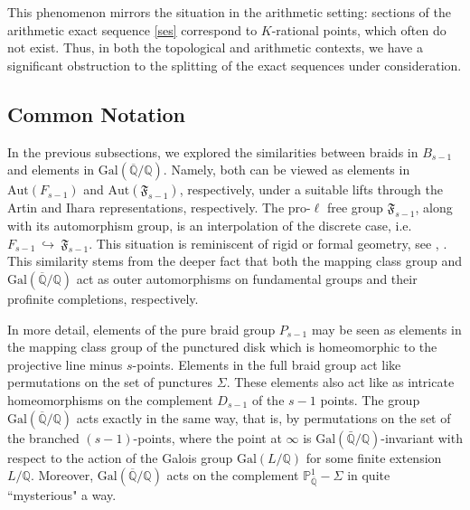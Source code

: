 \documentclass[10pt]{amsart}
\theoremstyle{definition}
\newcommand{\Q}{\mathbb{Q}}
\newcommand{\Gal}{{ \mathrm{Gal}}}
\begin{document}
This phenomenon mirrors the situation in the arithmetic setting: sections of the arithmetic exact sequence \eqref{ses} correspond to $K$-rational points, which often do not exist. Thus, in both the topological and arithmetic contexts, we have a significant obstruction to the splitting of the exact sequences under consideration.




\subsection{Common Notation} In the previous subsections, we explored the similarities between braids in $B_{s-1}$ and elements in $\Gal(\overline{\mathbb{Q}}/\mathbb{Q})$. 
Namely, both can be viewed as elements in $\mathrm{Aut}(F_{s-1})$ and $\mathrm{Aut}(\mathfrak{F}_{s-1})$, respectively, under a suitable lifts through the Artin and Ihara representations, respectively. The pro-$\ell$ free group $\mathfrak{F}_{s-1}$, along with its automorphism group, is an interpolation of the discrete case, i.e. $F_{s-1}~\hookrightarrow~\mathfrak{F}_{s-1}$. 
This situation is reminiscent of rigid or formal geometry, see \cite{KatoRigid}, \cite[Ch. 9]{Hartshorne:77}. 
This similarity stems from the deeper fact that both the mapping class group and $\Gal(\overline{\mathbb{Q}}/\mathbb{Q})$ act as outer automorphisms on fundamental groups and their profinite completions, respectively.

In more detail, elements of the pure braid group $P_{s-1}$ may be seen as elements in the mapping class group of the punctured disk which is homeomorphic to the projective line minus $s$-points. Elements in the full braid group act like permutations on the set of punctures $\Sigma$. 
These elements also act like as intricate homeomorphisms on the complement $D_{s-1}$ of the $s-1$ points. 
The group $\Gal(\overline{\Q}/\Q)$ acts exactly in the same way, that is, by permutations on the set of the branched $(s-1)$-points, where the point at $\infty$ is $\Gal(\bar{\Q}/\Q)$-invariant with respect to the action of the Galois group $\Gal(L/\Q)$ for some finite extension $L/\Q$. Moreover, $\Gal(\overline{\Q}/\Q)$ acts on the complement $\mathbb{P}^1_{\overline{\mathbb{Q}}}-\Sigma$ in quite ``mysterious" a way. 
\end{document}
